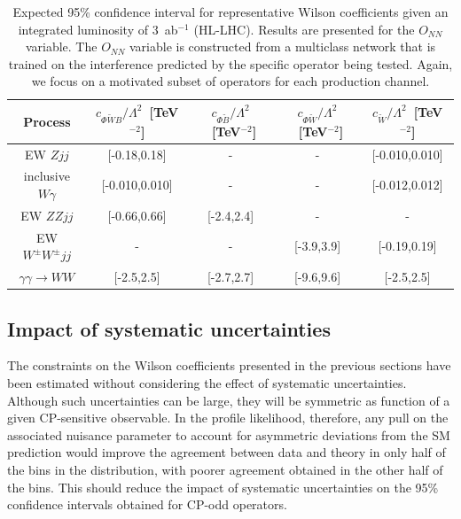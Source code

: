 \documentclass[twocolumn,preprintnumbers,superscriptaddress,nofootinbib,aps,prd,floatfix]{revtex4}
\begin{document}
\begin{table}[!t]
    \centering
    \begin{tabular}{|c|c|c|c|c|}
    \hline 
     Process & $c_{\Phi \widetilde{W}B} / \Lambda^2$~[TeV$^{-2}$] & $c_{ \Phi \widetilde{B}} / \Lambda^2$~[TeV$^{-2}$] & $c_{\Phi \widetilde{W}} / \Lambda^2$~[TeV$^{-2}$] & $c_{\widetilde{W}} / \Lambda^2$~[TeV$^{-2}$]\\
     \hline 
     EW $Zjj$ & [-0.18,0.18] & - & - & [-0.010,0.010] \\
     inclusive $W\gamma$ & [-0.010,0.010] & - & - & [-0.012,0.012] \\
     EW $ZZjj$ & [-0.66,0.66] & [-2.4,2.4] & - & -  \\
     EW $W^\pm W^\pm jj$ & - & - & [-3.9,3.9] & [-0.19,0.19] \\
     $\gamma\gamma\rightarrow WW$ & [-2.5,2.5] & [-2.7,2.7] & [-9.6,9.6] & [-2.5,2.5] \\
          \hline                   
    \end{tabular}
    \caption{Expected 95\% confidence interval for representative Wilson coefficients given an integrated luminosity of 3~ab$^{-1}$ (HL-LHC).
     Results are  presented for the $O_{NN}$ variable. The $O_{NN}$ variable is constructed from a multiclass network that is trained on the interference predicted by the specific operator being tested. Again, we focus on a motivated subset of operators for each production channel. 
    \label{tab:hllhc}}
\end{table}

\subsection{Impact of systematic uncertainties}
\label{sec:results_syst}

The constraints on the Wilson coefficients presented in the previous sections have been estimated without considering the effect of systematic uncertainties. Although such uncertainties can be large, they will be symmetric as function of a given CP-sensitive observable. In the profile likelihood, therefore, any pull on the associated nuisance parameter to account for asymmetric deviations from the SM prediction would improve the agreement between data and theory in only half of the bins in the distribution, with poorer agreement obtained in the other half of the bins. This should reduce the impact of systematic uncertainties on the 95\% confidence intervals obtained for CP-odd operators.
\end{document}
